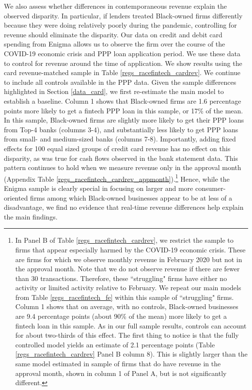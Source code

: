 \documentclass[11pt]{article}
\begin{document}
We also assess whether differences in contemporaneous revenue explain the observed disparity. In particular, if lenders treated Black-owned firms differently because they were doing relatively poorly during the pandemic, controlling for revenue should eliminate the disparity. Our data on credit and debit card spending from Enigma allows us to observe the firm over the course of the COVID-19 economic crisis and PPP loan application period. We use these data to control for revenue around the time of application.  We show results using the card revenue-matched sample in Table \ref{regs_racefintech_cardrev}. We continue to include all controls available in the PPP data. Given the sample differences highlighted in Section \ref{data_card}, we first re-estimate the main model to establish a baseline. Column 1 shows that Black-owned firms are 1.6 percentage points more likely to get a fintech PPP loan in this sample, or 17\% of the mean.  In this sample,  Black-owned firms  are slightly more likely to get their PPP loans from Top-4 banks (columns 3-4), and substantially less likely to get PPP loans from small- and medium-sized banks (columns 7-8). Importantly, adding fixed effects for 100 equal sized groups of credit card revenue has no effect on this disparity, as was true for cash flows observed in the bank statement data. This pattern continues to hold when we measure revenue only in the approval month (Appendix Table \ref{regs_racefintech_cardrev_appmonth}).\footnote{In Panel B of Table \ref{regs_racefintech_cardrev}, we restrict the sample to firms that appear especially harmed by the COVID-19 economic crisis. These are firms for which we observe monthly revenue in February 2020 but not in the approval month. Note that we do not observe revenue if there are fewer than 30 transactions. Therefore, these ``struggling" firms have either no activity or limited activity relative to February. We repeat our main models from Table  \ref{regs_racefintech_fe}  within this sample of ``struggling" firms. Column 1 shows that on average, with no controls, Black-owned businesses are 9.4 percentage points (about 90\% of the mean) more likely to get a fintech loan in this sample. As in our full sample results, controls can account for about two-thirds of this effect. The first thing to notice is that the fully controlled model yields an estimate of 2.1 percentage points (Table \ref{regs_racefintech_cardrev} Panel B column 8). This is slightly larger than the same model estimated in sample of firms that do have revenue in the approval month, shown in column 1 of Panel A, but is not significantly different.} Hence, while the Enigma sample is clearly special in focusing on larger and more consumer-oriented firms among which Black-owned businesses appear to be at less of a disadvantage, we find no evidence that real-time revenue differences help explain the main findings.
\end{document}
